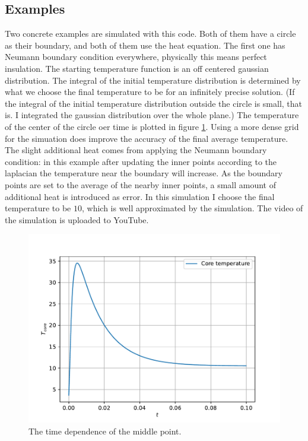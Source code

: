 \documentclass[pdftex,12pt,a4paper]{article}
\begin{document}
	\subsection{Examples}
		Two concrete examples are simulated with this code. Both of them have a circle as their boundary, and both of them use the heat equation. The first one has Neumann boundary condition everywhere, physically this means perfect insulation. The starting temperature function is an off centered gaussian distribution. The integral of the initial temperature distribution is determined by what we choose the final temperature to be for an infinitely precise solution. (If the integral of the initial temperature distribution outside the circle is small, that is. I integrated the gaussian distribution over the whole plane.) The temperature of the center of the circle oer time is plotted in figure \ref{timepdf}. Using a more dense grid for the simuation does improve the accuracy of the final average temperature. The slight additional heat comes from applying the Neumann boundary condition: in this example after updating the inner points according to the laplacian the temperature near the boundary will increase. As the boundary points are set to the average of the nearby inner points, a small amount of additional heat is introduced as error. In this simulation I choose the final temperature to be $10$, which is well approximated by the simulation. The video of the simulation is uploaded to YouTube. \cite{gaussian}
		\begin{figure}[H]
			\centering
			\includegraphics[scale=1]{./figs/time.pdf}
			\caption{The time dependence of the middle point.}
			\label{timepdf}
		\end{figure}
		
\end{document}
